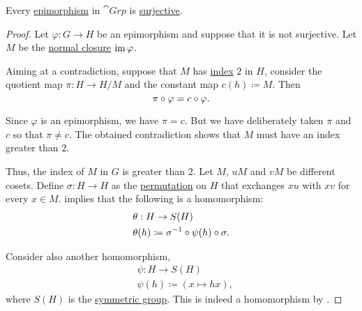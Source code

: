 \begin{proposition}\label{thm:group_epimorphisms_are_surjective}
  Every \hyperref[def:morphism_invertibility/right_cancellative]{epimorphism} in \hyperref[def:group/category]{\( \cat{Grp} \)} is \hyperref[def:function_invertibility/surjective]{surjective}.
\end{proposition}
\begin{proof}
  Let \( \varphi: G \to H \) be an epimorphism and suppose that it is not surjective. Let \( M \) be the \hyperref[def:normal_closure]{normal closure} \( \operatorname{im} \varphi \).

  Aiming at a contradiction, suppose that \( M \) has \hyperref[def:subgroup_index]{index} \( 2 \) in \( H \), consider the quotient map \( \pi: H \to H / M \) and the constant map \( c(h) \coloneqq M \). Then
  \begin{equation*}
    \pi \bincirc \varphi = c \bincirc \varphi.
  \end{equation*}

  Since \( \varphi \) is an epimorphism, we have \( \pi = c \). But we have deliberately taken \( \pi \) and \( c \) so that \( \pi \neq c \). The obtained contradiction shows that \( M \) must have an index greater than \( 2 \).

  Thus, the index of \( M \) in \( G \) is greater than \( 2 \). Let \( M \), \( uM \) and \( vM \) be different cosets. Define \( \sigma: H \to H \) as the \hyperref[def:symmetric_group]{permutation} on \( H \) that exchanges \( xu \) with \( xv \) for every \( x \in M \).  implies that the following is a homomorphism:
  \begin{equation*}
    \begin{aligned}
      &\theta: H \to S(H) \\
      &\theta(h) \coloneqq \sigma^{-1} \bincirc \psi(h) \bincirc \sigma.
    \end{aligned}
  \end{equation*}

  Consider also another homomorphism,
  \begin{equation*}
    \begin{aligned}
      &\psi: H \to S(H) \\
      &\psi(h) \coloneqq (x \mapsto hx),
    \end{aligned}
  \end{equation*}
  where \( S(H) \) is the \hyperref[def:symmetric_group]{symmetric group}. This is indeed a homomorphism by .


\end{proof}
